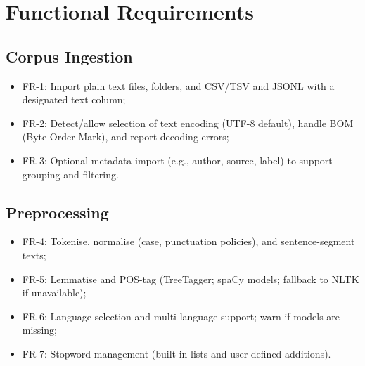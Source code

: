 \section{Functional Requirements}
\subsection{Corpus Ingestion}
\begin{itemize}
    \item FR-1: Import plain text files, folders, and CSV/TSV and JSONL with a designated text column;
    \item FR-2: Detect/allow selection of text encoding (UTF-8 default), handle BOM (Byte Order Mark), and report decoding errors;
    \item FR-3: Optional metadata import (e.g., author, source, label) to support grouping and filtering.
\end{itemize}

\subsection{Preprocessing}
\begin{itemize}
    \item FR-4: Tokenise, normalise (case, punctuation policies), and sentence-segment texts;
    \item FR-5: Lemmatise and POS-tag (TreeTagger; spaCy models; fallback to NLTK if unavailable);
    \item FR-6: Language selection and multi-language support; warn if models are missing;
    \item FR-7: Stopword management (built-in lists and user-defined additions).
\end{itemize}

